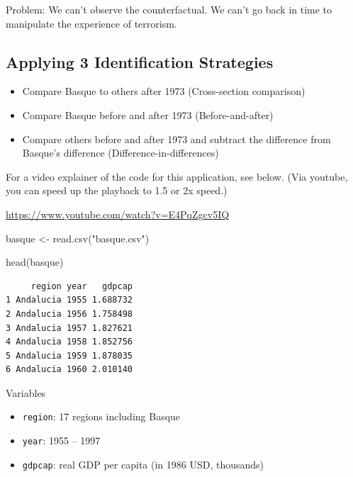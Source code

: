 \documentclass[
  letterpaper,
  DIV=11,
  numbers=noendperiod]{scrreprt}
\newenvironment{Shaded}{\begin{snugshade}}{\end{snugshade}}
\newcommand{\FunctionTok}[1]{\textcolor[rgb]{0.28,0.35,0.67}{#1}}
\newcommand{\NormalTok}[1]{\textcolor[rgb]{0.00,0.23,0.31}{#1}}
\newcommand{\OtherTok}[1]{\textcolor[rgb]{0.00,0.23,0.31}{#1}}
\newcommand{\StringTok}[1]{\textcolor[rgb]{0.13,0.47,0.30}{#1}}
\providecommand{\tightlist}{%
  \setlength{\itemsep}{0pt}\setlength{\parskip}{0pt}}\usepackage{longtable,booktabs,array}
\begin{document}
Problem: We can't observe the counterfactual. We can't go back in time
to manipulate the experience of terrorism.

\hypertarget{applying-3-identification-strategies}{%
\subsection{Applying 3 Identification
Strategies}\label{applying-3-identification-strategies}}

\begin{itemize}
\tightlist
\item
  Compare Basque to others after 1973 (Cross-section comparison)
\item
  Compare Basque before and after 1973 (Before-and-after)
\item
  Compare others before and after 1973 and subtract the difference from
  Basque's difference (Difference-in-differences)
\end{itemize}

For a video explainer of the code for this application, see below. (Via
youtube, you can speed up the playback to 1.5 or 2x speed.)

\url{https://www.youtube.com/watch?v=E4PqZgcv5IQ}

\begin{Shaded}
\begin{Highlighting}[]
\NormalTok{basque }\OtherTok{\textless{}{-}} \FunctionTok{read.csv}\NormalTok{(}\StringTok{"basque.csv"}\NormalTok{)}
\end{Highlighting}
\end{Shaded}

\begin{Shaded}
\begin{Highlighting}[]
\FunctionTok{head}\NormalTok{(basque)}
\end{Highlighting}
\end{Shaded}

\begin{verbatim}
     region year   gdpcap
1 Andalucia 1955 1.688732
2 Andalucia 1956 1.758498
3 Andalucia 1957 1.827621
4 Andalucia 1958 1.852756
5 Andalucia 1959 1.878035
6 Andalucia 1960 2.010140
\end{verbatim}

Variables

\begin{itemize}
\tightlist
\item
  \texttt{region}: 17 regions including Basque
\item
  \texttt{year}: 1955 -- 1997
\item
  \texttt{gdpcap}: real GDP per capita (in 1986 USD, thousands)
\end{itemize}
\end{document}
